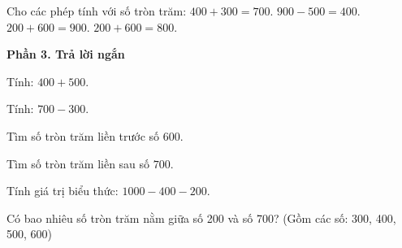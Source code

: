 \begin{ex} %
Cho các phép tính với số tròn trăm:
\choiceTF
{\True $400 + 300 = 700$.}
{\True $900 - 500 = 400$.}
{$200 + 600 = 900$.}
{\True $200 + 600 = 800$.}
\end{ex}

\textbf{Phần 3. Trả lời ngắn}

\begin{ex} %
Tính: $400 + 500$.
\end{ex}

\begin{ex} %
Tính: $700 - 300$.
\end{ex}

\begin{ex} %
Tìm số tròn trăm liền trước số $600$.
\end{ex}

\begin{ex} %
Tìm số tròn trăm liền sau số $700$.
\end{ex}

\begin{ex} %
Tính giá trị biểu thức: $1000 - 400 - 200$.
\end{ex}

\begin{ex} %
Có bao nhiêu số tròn trăm nằm giữa số 200 và số 700? (Gồm các số: 300, 400, 500, 600)
\end{ex}
